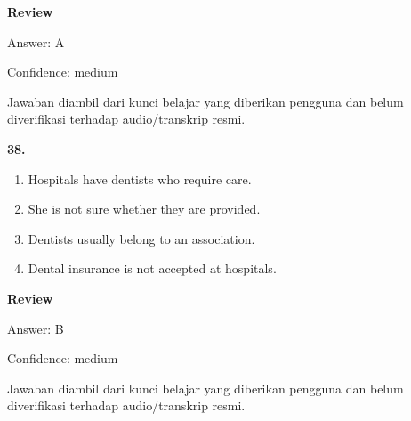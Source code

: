 \documentclass[12pt]{article}
\begin{document}
\par
\begingroup
\setlength{\parskip}{0pt}
\setlength{\parindent}{0pt}
\textbf{Review}\par
Answer: A\par
Confidence: medium\par
Jawaban diambil dari kunci belajar yang diberikan pengguna dan belum diverifikasi terhadap audio/transkrip resmi.\par
\endgroup
\par
\vspace{0.25\baselineskip}
\noindent\textbf{38.}
\begin{enumerate}[label=(\Alph*),leftmargin=*,itemsep=0.2em]
\item Hospitals have dentists who require care.
\item She is not sure whether they are provided.
\item Dentists usually belong to an association.
\item Dental insurance is not accepted at hospitals.
\end{enumerate}
\par
\begingroup
\setlength{\parskip}{0pt}
\setlength{\parindent}{0pt}
\textbf{Review}\par
Answer: B\par
Confidence: medium\par
Jawaban diambil dari kunci belajar yang diberikan pengguna dan belum diverifikasi terhadap audio/transkrip resmi.\par
\endgroup
\par
\vspace{0.25\baselineskip}
\end{document}
